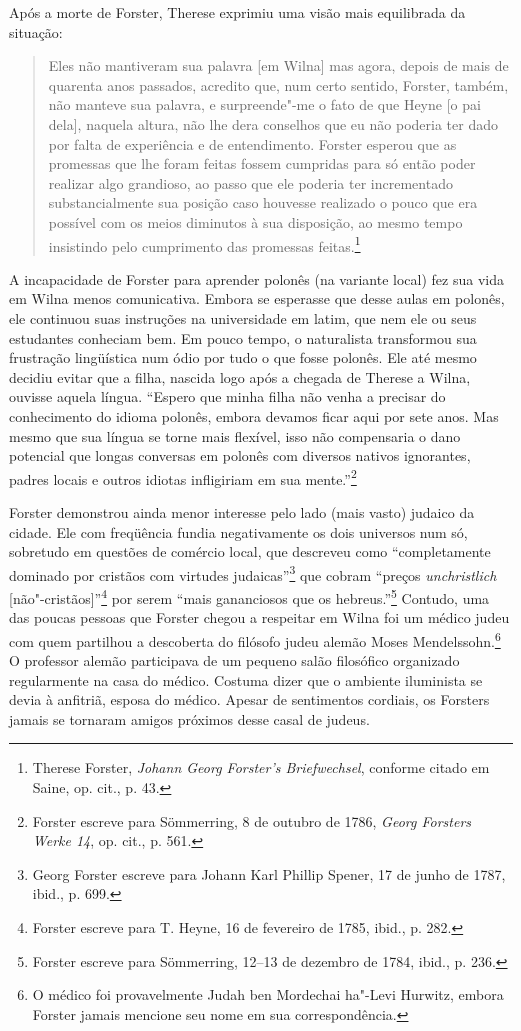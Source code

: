 Após a morte de Forster, Therese exprimiu uma visão mais equilibrada da
situação:

\begin{quote}
Eles não mantiveram sua palavra {[}em Wilna{]} mas agora, depois de mais
de quarenta anos passados, acredito que, num certo sentido, Forster,
também, não manteve sua palavra, e surpreende"-me o fato de que Heyne
{[}o pai dela{]}, naquela altura, não lhe dera conselhos que eu não
poderia ter dado por falta de experiência e de entendimento. Forster
esperou que as promessas que lhe foram feitas fossem cumpridas para só
então poder realizar algo grandioso, ao passo que ele poderia ter
incrementado substancialmente sua posição caso houvesse realizado o
pouco que era possível com os meios diminutos à sua disposição, ao mesmo
tempo insistindo pelo cumprimento das promessas feitas.\footnote{Therese
  Forster, \emph{Johann Georg Forster's Briefwechsel}, conforme citado
  em Saine, op. cit., p. 43.}
  \end{quote}

A incapacidade de Forster para aprender polonês (na variante local) fez
sua vida em Wilna menos comunicativa. Embora se esperasse que desse
aulas em polonês, ele continuou suas instruções na universidade em
latim, que nem ele ou seus estudantes conheciam bem. Em pouco tempo, o
naturalista transformou sua frustração lingüística num ódio por tudo o
que fosse polonês. Ele até mesmo decidiu evitar que a filha, nascida
logo após a chegada de Therese a Wilna, ouvisse aquela língua. ``Espero
que minha filha não venha a precisar do conhecimento do idioma polonês,
embora devamos ficar aqui por sete anos. Mas mesmo que sua língua se
torne mais flexível, isso não compensaria o dano potencial que longas
conversas em polonês com diversos nativos ignorantes, padres locais e
outros idiotas infligiriam em sua mente.''\footnote{Forster escreve para
  Sömmerring, 8 de outubro de 1786, \emph{Georg Forsters Werke 14}, op.
  cit., p. 561.}

Forster demonstrou ainda menor interesse pelo lado (mais vasto) judaico
da cidade. Ele com freqüência fundia negativamente os dois universos num
só, sobretudo em questões de comércio local, que descreveu como
``completamente dominado por cristãos com virtudes judaicas''\footnote{Georg
  Forster escreve para Johann Karl Phillip Spener, 17 de junho de 1787,
  ibid., p. 699.} que cobram ``preços \emph{unchristlich}
{[}não"-cristãos{]}''\footnote{Forster escreve para T. Heyne, 16 de
  fevereiro de 1785, ibid., p. 282.} por serem ``mais gananciosos que os
hebreus.''\footnote{Forster escreve para Sömmerring, 12--13 de dezembro
  de 1784, ibid., p. 236.} Contudo, uma das poucas pessoas que Forster
chegou a respeitar em Wilna foi um médico judeu com quem partilhou a
descoberta do filósofo judeu alemão Moses Mendelssohn.\footnote{O médico
  foi provavelmente Judah ben Mordechai ha"-Levi Hurwitz, embora Forster
  jamais mencione seu nome em sua correspondência.} O professor alemão
participava de um pequeno salão filosófico organizado regularmente na
casa do médico. Costuma dizer que o ambiente iluminista se devia à
anfitriã, esposa do médico. Apesar de sentimentos cordiais, os Forsters
jamais se tornaram amigos próximos desse casal de judeus.

